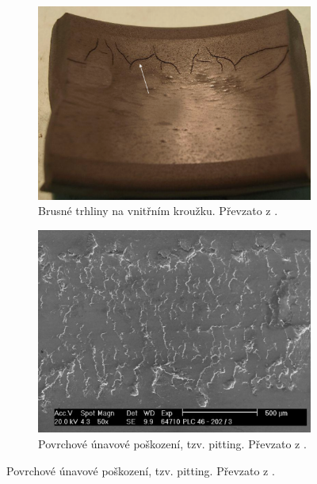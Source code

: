     \begin{figure} [!h]
        \centering
        \caption{Příklady poškození ložisek}
        \begin{subfigure}[b]{0.48\textwidth}
             \centering
             \includegraphics[width=\textwidth]{DSP/Figs/poruchy_lozisek.png}
             \caption {Brusné trhliny na vnitřním kroužku. Převzato z \cite{prez:1}.}
         \end{subfigure}
         \hfill
        \begin{subfigure}[b]{0.46\textwidth}
            \includegraphics[width=\textwidth]{DSP/Figs/poruchy_lozisek2.png}
            \caption {Povrchové únavové poškození, tzv. pitting. Převzato z \cite{prez:1}.}
        \end{subfigure}
    \end{figure} 
    
